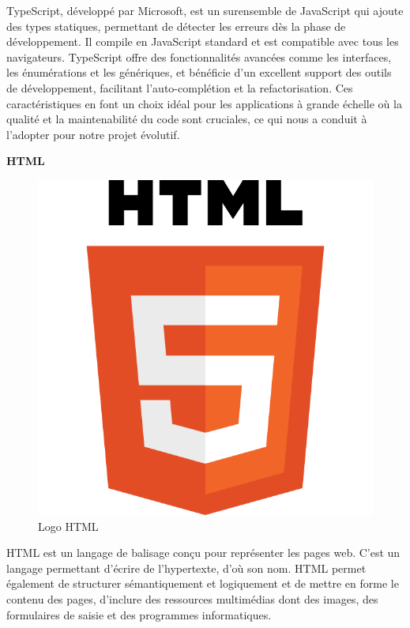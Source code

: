 TypeScript, développé par Microsoft, est un surensemble de 
JavaScript qui ajoute des types statiques, permettant de
détecter les erreurs dès la phase de développement. Il compile 
en JavaScript standard et est compatible avec tous les 
navigateurs. TypeScript offre des fonctionnalités avancées 
comme les interfaces, les énumérations et les génériques, 
et bénéficie d'un excellent support des outils de développement, 
facilitant l'auto-complétion et la refactorisation\cite{TypeScript}. 
Ces caractéristiques en 
font un choix idéal pour les applications à grande échelle 
où la qualité et la maintenabilité du code sont cruciales, 
ce qui nous a conduit à l'adopter pour notre projet évolutif.
\newline

\large
\textbf{HTML}
\begin{figure}[htbp]
   \centering
   \includegraphics[scale=0.15]{Images/html.png} 
   \caption{Logo HTML\cite{HTML}}
   \label{fig:html}
\end{figure}

HTML est un langage de balisage conçu pour représenter les pages
 web. C’est un langage permettant d’écrire de l’hypertexte, 
 d’où son nom. HTML permet également de structurer sémantiquement 
 et logiquement et de mettre en forme le contenu des pages, 
 d’inclure des ressources multimédias dont des images, des 
 formulaires de saisie et des programmes informatiques\cite{HTML}.
\newline

